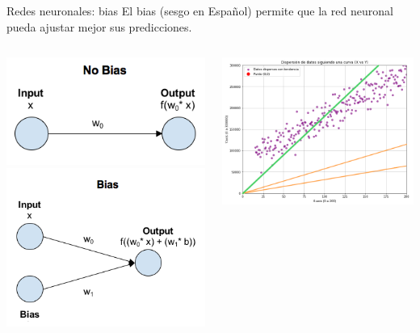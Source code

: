 \begin{frame}{Redes neuronales: bias}
El \alert{bias} (sesgo en Español) permite que la red neuronal pueda ajustar mejor sus predicciones. 
\begin{columns}[c]
\centering
\begin{column}{0.4\textwidth}
    \centering
    \includegraphics[width=\textwidth]{figures/Introduccion/bias-no.png}
    \includegraphics[width=\textwidth]{figures/Introduccion/bias-si.png}
\end{column}
\begin{column}{0.4\textwidth}
    \centering
    \includegraphics[width=\textwidth]{figures/Introduccion/bias-no-data.png}

\end{column}
\end{columns}
\end{frame}
